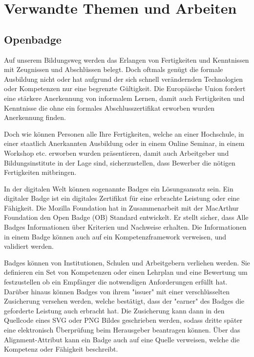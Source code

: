 \section{Verwandte Themen und Arbeiten}\label{similar_topics}

\subsection{Openbadge}\label{openbadge}

Auf unserem Bildungsweg werden das Erlangen von Fertigkeiten und Kenntnissen mit Zeugnissen und Abschlüssen belegt. Doch oftmals genügt die formale Ausbildung nicht oder hat aufgrund der sich schnell verändernden Technologien oder Kompetenzen nur eine begrenzte Gültigkeit.  
Die Europäische Union fordert eine stärkere Anerkennung von informalem Lernen, damit auch Fertigkeiten und Kenntnisse die ohne ein formales Abschlusszertifikat erworben wurden Anerkennung finden.\cite{Dorn2014}\newline

Doch wie können Personen alle Ihre Fertigkeiten, welche an einer Hochschule, in einer staatlich Anerkannten Ausbildung oder  in einem Online Seminar, in einem Workshop etc. erworben wurden präsentieren, damit auch Arbeitgeber und Bildungsinstitute in der Lage sind, sicherzustellen, dass Bewerber die nötigen Fertigkeiten mitbringen.\cite{alliance_for_excellent_education}\newline

In der digitalen Welt können sogenannte Badges ein Lösungsansatz sein. Ein digitaler Badge ist ein digitales Zertifikat für eine erbrachte Leistung oder eine Fähigkeit. 
Die Mozilla Foundation hat in Zusammenarbeit mit der MacArthur Foundation den Open Badge (OB) Standard entwickelt. Er stellt sicher, dass Alle Badges Informationen über Kriterien und Nachweise erhalten. Die Informationen in einem Badge können auch auf ein Kompetenzframework verweisen, und validiert werden.\cite[4]{alliance_for_excellent_education}

\vspace{1em}

Badges können von Institutionen, Schulen und Arbeitgebern verliehen werden. Sie definieren ein Set von Kompetenzen oder einen Lehrplan und eine Bewertung um festzustellen ob ein Empfänger die notwendigen Anforderungen erfüllt hat. Darüber hinaus können Badges von ihrem "issuer" mit einer verschlüsselten Zusicherung versehen werden, welche bestätigt, dass der "earner" des Badges die geforderte Leistung auch erbracht hat. 
Die Zusicherung kann dann in den Quellcode eines SVG oder PNG Bildes geschrieben werden, sodass dritte später eine elektronisch Überprüfung beim Herausgeber beantragen können. Über das Alignment-Attribut kann ein Badge auch auf eine Quelle verweisen, welche die Kompetenz oder Fähigkeit beschreibt.


